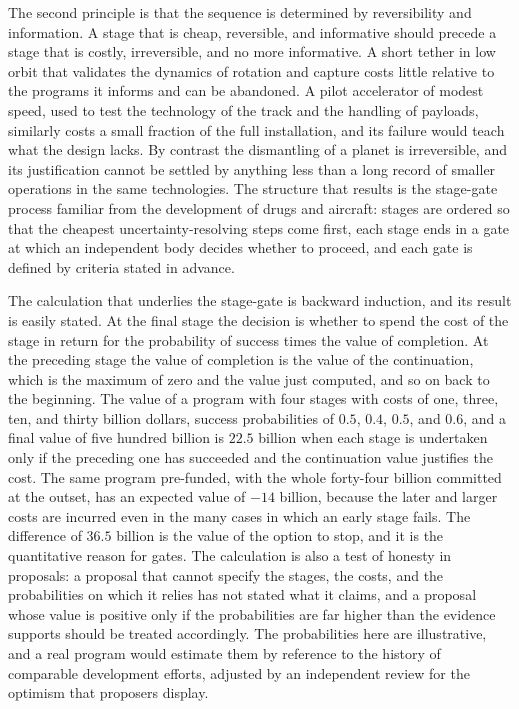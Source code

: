 The second principle is that the sequence is determined by reversibility and information. A stage that is cheap, reversible, and informative should precede a stage that is costly, irreversible, and no more informative. A short tether in low orbit that validates the dynamics of rotation and capture costs little relative to the programs it informs and can be abandoned. A pilot accelerator of modest speed, used to test the technology of the track and the handling of payloads, similarly costs a small fraction of the full installation, and its failure would teach what the design lacks. By contrast the dismantling of a planet is irreversible, and its justification cannot be settled by anything less than a long record of smaller operations in the same technologies. The structure that results is the stage-gate process familiar from the development of drugs and aircraft: stages are ordered so that the cheapest uncertainty-resolving steps come first, each stage ends in a gate at which an independent body decides whether to proceed, and each gate is defined by criteria stated in advance.

The calculation that underlies the stage-gate is backward induction, and its result is easily stated. At the final stage the decision is whether to spend the cost of the stage in return for the probability of success times the value of completion. At the preceding stage the value of completion is the value of the continuation, which is the maximum of zero and the value just computed, and so on back to the beginning. The value of a program with four stages with costs of one, three, ten, and thirty billion dollars, success probabilities of $0.5$, $0.4$, $0.5$, and $0.6$, and a final value of five hundred billion is $22.5$ billion when each stage is undertaken only if the preceding one has succeeded and the continuation value justifies the cost. The same program pre-funded, with the whole forty-four billion committed at the outset, has an expected value of $-14$ billion, because the later and larger costs are incurred even in the many cases in which an early stage fails. The difference of $36.5$ billion is the value of the option to stop, and it is the quantitative reason for gates. The calculation is also a test of honesty in proposals: a proposal that cannot specify the stages, the costs, and the probabilities on which it relies has not stated what it claims, and a proposal whose value is positive only if the probabilities are far higher than the evidence supports should be treated accordingly. The probabilities here are illustrative, and a real program would estimate them by reference to the history of comparable development efforts, adjusted by an independent review for the optimism that proposers display.

